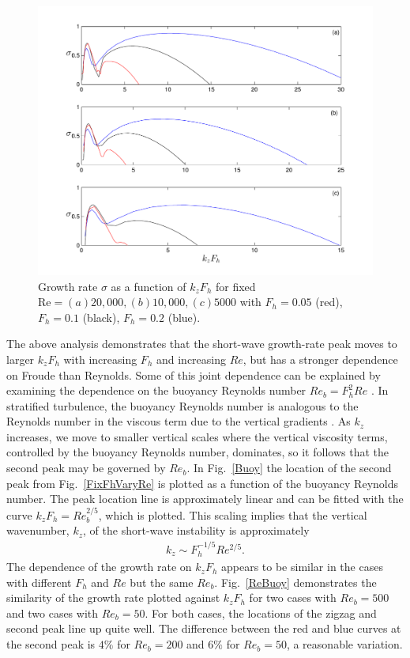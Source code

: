 \begin{figure}
\begin{center}
\includegraphics[width=\textwidth]{fixed_reynolds_varying_froude}
\caption{Growth rate $\sigma$ as a function of $k_{z}F_{h}$ for fixed $\text{Re}=(a) 20{,}000, (b) 10{,}000, (c) 5000$ with $F_{h}=0.05$ (red), $F_{h}=0.1$ (black), $F_{h}=0.2$ (blue).}
\label{FixReVaryFh}
\end{center}
\end{figure}
The above analysis demonstrates that the short-wave growth-rate peak moves to larger $k_{z}F_{h}$ with increasing $F_{h}$ and increasing $Re$, but has a stronger dependence on Froude than Reynolds. Some of this joint dependence can be explained by examining the dependence on the buoyancy Reynolds number $Re_{b}=F_{h}^{2}Re$ \cite{riley2003,hebert2006,brethouwer2007}. In stratified turbulence, the buoyancy Reynolds number is analogous to the Reynolds number in the viscous term due to the vertical gradients \cite{brethouwer2007}. As $k_{z}$ increases, we move to smaller vertical scales where the vertical viscosity terms, controlled by the buoyancy Reynolds number, dominates, so it follows that the second peak may be governed by $Re_{b}$. In Fig.~\ref{Buoy} the location of the second peak from Fig.~\ref{FixFhVaryRe} is plotted as a function of the buoyancy Reynolds number. The peak location line is approximately linear and can be fitted with the curve $k_{z}F_{h}= Re_{b}^{2/5}$, which is plotted. This scaling implies that the vertical wavenumber, $k_{z}$, of the short-wave instability is approximately 
\begin{align}
k_{z} \sim F_{h}^{-1/5} Re^{2/5}\label{buoyscale}.
\end{align} 
The dependence of the growth rate on $k_{z}F_{h}$ appears to be similar in the cases with different $F_{h}$ and $Re$ but the same $Re_{b}$. Fig.~\ref{ReBuoy} demonstrates the similarity of the growth rate plotted against $k_{z}F_{h}$ for two cases with $Re_{b}=500$ and two cases with $Re_{b}=50$. For both cases, the locations of the zigzag and second peak line up quite well. The difference between the red and blue curves at the second peak is $4\%$ for $Re_{b}=200$ and $6\%$ for $Re_{b}=50$, a reasonable variation. 

